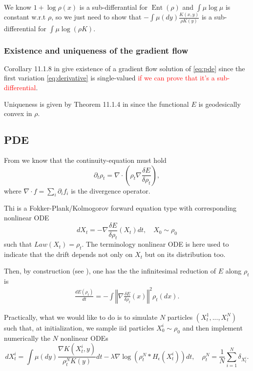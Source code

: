 \documentclass[a4paper]{article}
\DeclareMathOperator{\ent}{Ent}
\begin{document}
We know $1+\log\rho\left(x\right)$ is a sub-differantial for $\ent(\rho)$ and $\int \mu \log \mu$ is constant w.r.t $\rho$, so we just need to show that $-\int\mu\left(dy\right)\frac{K(x,y)}{\rho K(y)}$ is a sub-differential for $\int \mu\log(\rho K)$.

\subsubsection{Existence and uniqueness of the gradient flow}

Corollary 11.1.8 in \cite{ambrosio2008gradient} give existence of a gradient flow solution of \eqref{eq:pde} since the first variation \eqref{eq:derivative} is single-valued \textcolor{red}{if we can prove that it's a sub-differential}.

Uniqueness is given by Theorem 11.1.4 in \cite{ambrosio2008gradient} since the functional $E$ is geodesically convex in $\rho$.

\subsection{PDE}
From \citet[Definition 11.1.1]{ambrosio2008gradient} we know that the continuity-equation must hold
\begin{equation}
\label{eq:pde}
\partial_{t}\rho_{t}=\nabla\cdot\left(\rho_{t}\nabla\frac{\delta E}{\delta\rho_{t}}\right),
\end{equation}
where $\nabla\cdot f=\sum_{i}\partial_{i}f_{i}$ is the divergence operator.

Thi is a Fokker-Plank/Kolmogorov forward equation type with corresponding nonlinear ODE \citep{jordan1998variational}
\begin{equation}
dX_{t}=-\nabla\frac{\delta E}{\delta\rho_{t}}\left(X_{t}\right)dt,\quad X_{0}\sim\rho_{0}\label{eq:nonlinearODE}
\end{equation}
such that $Law(X_{t})=\rho_{t}$.
The terminology nonlinear ODE is here used to indicate that the drift depends not only on $X_{t}$ but on its distribution too.

Then, by construction (see \citet[page 14]{arbel2019maximum}), one has the the infinitesimal reduction of $E$ along $\rho_t$ is
\begin{align*}
\frac{dE\left(\rho_{t}\right)}{dt}=-\int\left\Vert \nabla\frac{\delta E}{\delta\rho_{t}}\left(x\right)\right\Vert ^{2}\rho_{t}\left(dx\right).
\end{align*}


Practically, what we would like to do is to simulate $N$ particles $(X_{t}^{1},...,X_{t}^{N})$ such that, at initialization, we sample iid particles  $X_{0}^{i}\sim\rho_{0}$ and then implement numerically the $N$ nonlinear ODEs
\[
dX_{t}^{i}=\int\mu\left(dy\right)\frac{\nabla K(X_{t}^{i},y)}{\rho_{t}^{N}K(y)}dt-\lambda\nabla\log\left(\rho_{t}^{N}*H_{\epsilon}\left(X_{t}^{i}\right)\right)dt,\quad\rho_{t}^{N}=\frac{1}{N}\sum_{i=1}^{N}\delta_{X_{t}^{i}}.
\]
\end{document}
